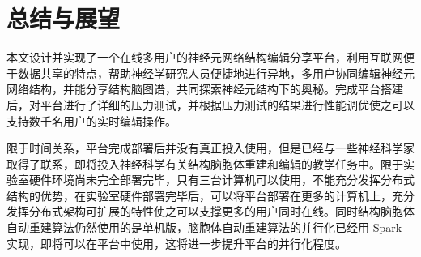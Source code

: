 \chapter{总结与展望}
本文设计并实现了一个在线多用户的神经元网络结构编辑分享平台，利用互联网便于数据共享的特点，帮助神经学研究人员便捷地进行异地，多用户协同编辑神经元网络结构，并能分享结构脑图谱，共同探索神经元结构下的奥秘。完成平台搭建后，对平台进行了详细的压力测试，并根据压力测试的结果进行性能调优使之可以支持数千名用户的实时编辑操作。

限于时间关系，平台完成部署后并没有真正投入使用，但是已经与一些神经科学家取得了联系，即将投入神经科学有关结构脑胞体重建和编辑的教学任务中。限于实验室硬件环境尚未完全部署完毕，只有三台计算机可以使用，不能充分发挥分布式结构的优势，在实验室硬件部署完毕后，可以将平台部署在更多的计算机上，充分发挥分布式架构可扩展的特性使之可以支撑更多的用户同时在线。同时结构脑胞体自动重建算法仍然使用的是单机版，脑胞体自动重建算法的并行化已经用 Spark 实现，即将可以在平台中使用，这将进一步提升平台的并行化程度。